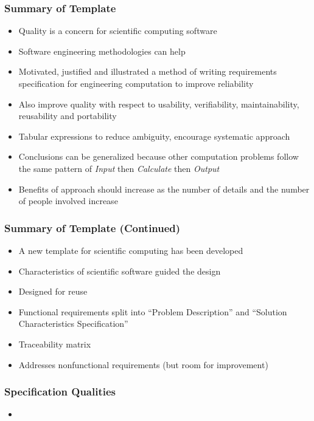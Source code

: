 \documentclass[t,12pt,numbers,fleqn]{beamer}
\newcounter{temp}
\begin{document}
\begin{frame}
\frametitle{Summary of Template}
\begin{itemize}
\item Quality is a concern for scientific computing software
\item Software engineering methodologies can help
\item Motivated, justified and illustrated a method of writing requirements specification for engineering computation
to improve reliability
\item Also improve quality with respect to usability, verifiability, maintainability, reusability and portability
\item Tabular expressions to reduce ambiguity, encourage systematic approach
\item Conclusions can be generalized because other computation problems follow the same pattern of \emph{Input} then
\emph{Calculate} then \emph{Output}
\item Benefits of approach should increase as the number of details and the number of people involved increase
\end{itemize}
\end{frame}


\begin{frame}
\frametitle{Summary of Template (Continued)}
\begin{itemize}
\item A new template for scientific computing has been developed
\item Characteristics of scientific software guided the design
\item Designed for reuse
\item Functional requirements split into ``Problem Description'' and ``Solution Characteristics Specification''
\item Traceability matrix
\item Addresses nonfunctional requirements (but room for improvement)
\end{itemize}

\end{frame}


\begin{frame}
\frametitle{Specification Qualities}

\begin{itemize}

\item {}

\end{itemize}

\end{frame}
\end{document}
